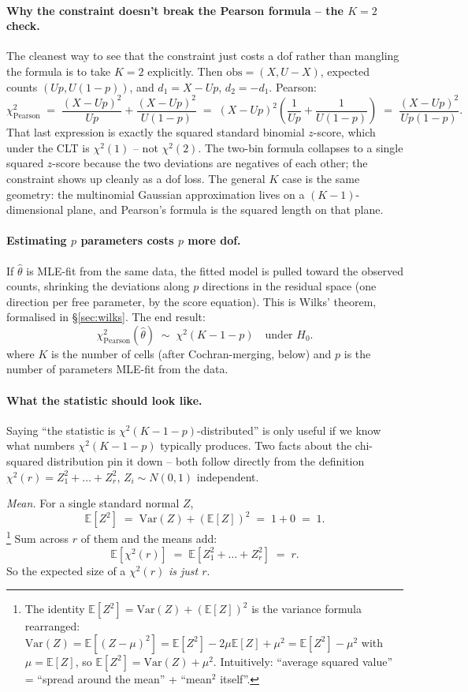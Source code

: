\documentclass[11pt]{article}
\newcommand{\E}{\mathbb{E}}
\newcommand{\Var}{\mathrm{Var}}
\newcommand{\obs}{\mathrm{obs}}
\begin{document}
\paragraph{Why the constraint doesn't break the Pearson formula -- the $K=2$ check.}
The cleanest way to see that the constraint just costs a dof rather than
mangling the formula is to take $K=2$ explicitly. Then $\obs = (X, U-X)$,
expected counts $(Up, U(1-p))$, and $d_1 = X - Up$, $d_2 = -d_1$. Pearson:
\[
   \chi^{2}_{\text{Pearson}}
   \;=\; \frac{(X - Up)^2}{Up} + \frac{(X-Up)^2}{U(1-p)}
   \;=\; (X-Up)^2\!\left(\frac{1}{Up} + \frac{1}{U(1-p)}\right)
   \;=\; \frac{(X-Up)^2}{Up(1-p)}.
\]
That last expression is exactly the squared standard binomial $z$-score,
which under the CLT is $\chi^{2}(1)$ -- not $\chi^{2}(2)$. The two-bin
formula collapses to a single squared $z$-score because the two deviations
are negatives of each other; the constraint shows up cleanly as a dof loss.
The general $K$ case is the same geometry: the multinomial Gaussian
approximation lives on a $(K-1)$-dimensional plane, and Pearson's formula is
the squared length on that plane.

\paragraph{Estimating $p$ parameters costs $p$ more dof.}
If $\hat\theta$ is MLE-fit from the same data, the fitted model is pulled
toward the observed counts, shrinking the deviations along $p$ directions in
the residual space (one direction per free parameter, by the score equation).
This is Wilks' theorem, formalised in \S\ref{sec:wilks}. The end result:
\[
   \chi^{2}_{\text{Pearson}}(\hat\theta) \;\sim\; \chi^{2}(K - 1 - p)
   \quad \text{under } H_0.
\]
where $K$ is the number of cells (after Cochran-merging, below) and $p$ is
the number of parameters MLE-fit from the data.

\paragraph{What the statistic should look like.}

Saying ``the statistic is $\chi^{2}(K-1-p)$-distributed'' is only useful if
we know what numbers $\chi^{2}(K-1-p)$ typically produces. Two facts about
the chi-squared distribution pin it down -- both follow directly from the
definition $\chi^{2}(r) = Z_1^2 + \dots + Z_r^2$, $Z_i \sim N(0,1)$
independent.

\emph{Mean.} For a single standard normal $Z$,
\[
   \E[Z^2] \;=\; \Var(Z) + (\E[Z])^2 \;=\; 1 + 0 \;=\; 1.
\]\footnote{The identity $\E[Z^2] = \Var(Z) + (\E[Z])^2$ is the variance
formula rearranged: $\Var(Z) = \E[(Z-\mu)^2] = \E[Z^2] - 2\mu\E[Z] + \mu^2 =
\E[Z^2] - \mu^2$ with $\mu = \E[Z]$, so $\E[Z^2] = \Var(Z) + \mu^2$.
Intuitively: ``average squared value'' = ``spread around the mean'' +
``mean$^2$ itself''.}
Sum across $r$ of them and the means add:
\[
   \E[\chi^{2}(r)] \;=\; \E[Z_1^2 + \dots + Z_r^2] \;=\; r.
\]
So the expected size of a $\chi^{2}(r)$ \emph{is just $r$}.
\end{document}
